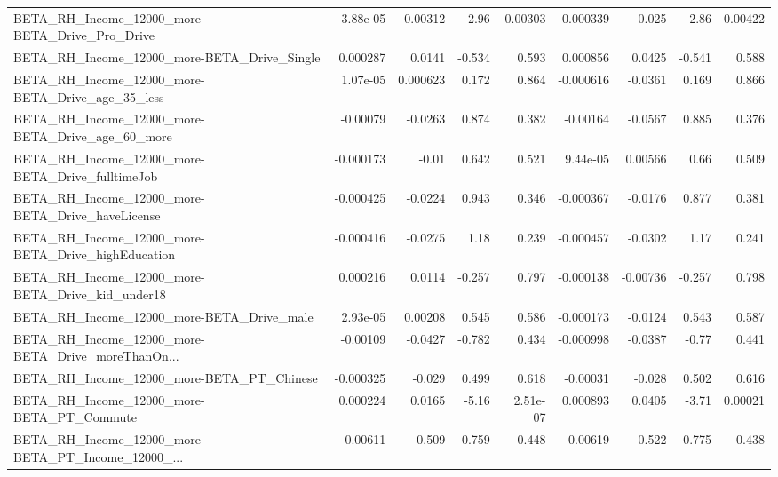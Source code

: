 \begin{tabular}{lrrrrrrrr}
BETA\_RH\_Income\_12000\_more-BETA\_Drive\_Pro\_Drive     &   -3.88e-05 &     -0.00312 &    -2.96 &  0.00303 &   0.000339 &       0.025 &        -2.86 &       0.00422 \\
BETA\_RH\_Income\_12000\_more-BETA\_Drive\_Single        &    0.000287 &       0.0141 &   -0.534 &    0.593 &   0.000856 &      0.0425 &       -0.541 &         0.588 \\
BETA\_RH\_Income\_12000\_more-BETA\_Drive\_age\_35\_less   &    1.07e-05 &     0.000623 &    0.172 &    0.864 &  -0.000616 &     -0.0361 &        0.169 &         0.866 \\
BETA\_RH\_Income\_12000\_more-BETA\_Drive\_age\_60\_more   &    -0.00079 &      -0.0263 &    0.874 &    0.382 &   -0.00164 &     -0.0567 &        0.885 &         0.376 \\
BETA\_RH\_Income\_12000\_more-BETA\_Drive\_fulltimeJob   &   -0.000173 &        -0.01 &    0.642 &    0.521 &   9.44e-05 &     0.00566 &         0.66 &         0.509 \\
BETA\_RH\_Income\_12000\_more-BETA\_Drive\_haveLicense   &   -0.000425 &      -0.0224 &    0.943 &    0.346 &  -0.000367 &     -0.0176 &        0.877 &         0.381 \\
BETA\_RH\_Income\_12000\_more-BETA\_Drive\_highEducation &   -0.000416 &      -0.0275 &     1.18 &    0.239 &  -0.000457 &     -0.0302 &         1.17 &         0.241 \\
BETA\_RH\_Income\_12000\_more-BETA\_Drive\_kid\_under18   &    0.000216 &       0.0114 &   -0.257 &    0.797 &  -0.000138 &    -0.00736 &       -0.257 &         0.798 \\
BETA\_RH\_Income\_12000\_more-BETA\_Drive\_male          &    2.93e-05 &      0.00208 &    0.545 &    0.586 &  -0.000173 &     -0.0124 &        0.543 &         0.587 \\
BETA\_RH\_Income\_12000\_more-BETA\_Drive\_moreThanOn... &    -0.00109 &      -0.0427 &   -0.782 &    0.434 &  -0.000998 &     -0.0387 &        -0.77 &         0.441 \\
BETA\_RH\_Income\_12000\_more-BETA\_PT\_Chinese          &   -0.000325 &       -0.029 &    0.499 &    0.618 &   -0.00031 &      -0.028 &        0.502 &         0.616 \\
BETA\_RH\_Income\_12000\_more-BETA\_PT\_Commute          &    0.000224 &       0.0165 &    -5.16 & 2.51e-07 &   0.000893 &      0.0405 &        -3.71 &       0.00021 \\
BETA\_RH\_Income\_12000\_more-BETA\_PT\_Income\_12000\_... &     0.00611 &        0.509 &    0.759 &    0.448 &    0.00619 &       0.522 &        0.775 &         0.438 \\

\end{tabular}
